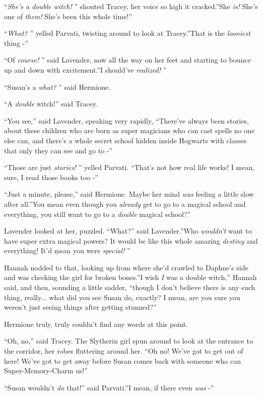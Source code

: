 ``\emph{She's a double witch!} '' shouted Tracey, her voice so high it
cracked.''She \emph{is!} She's one of \emph{them!} She's been this whole
time!''

``\emph{What?} '' yelled Parvati, twisting around to look at Tracey.''That
is the \emph{looniest} thing -''

``Of \emph{course!} '' said Lavender, now all the way on her feet and
starting to bounce up and down with excitement.''I should've
\emph{realized!} ''

``Susan's a \emph{what?} '' said Hermione.

``A \emph{double} witch!'' said Tracey.

``You see,'' said Lavender, speaking very rapidly, ``There've always
been stories, about these children who are born as super magicians who
can cast spells no one else can, and there's a whole secret school
hidden inside Hogwarts with classes that only they can see and go to -''

``Those are just \emph{stories!} '' yelled Parvati. ``That's not how real
life works! I mean, sure, I read those books too -''

``Just a minute, please,'' said Hermione. Maybe her mind \emph{was}
feeling a little slow after all.''You mean even though you
\emph{already} get to go to a magical school and everything, you still
want to go to a \emph{double} magical school?''

Lavender looked at her, puzzled. ``What?'' said Lavender.''Who
\emph{wouldn't} want to have super extra magical powers? It would be
like this whole amazing \emph{destiny} and everything! It'd mean you
were \emph{special!} ''

Hannah nodded to that, looking up from where she'd crawled to Daphne's
side and was checking the girl for broken bones.''I wish \emph{I} was a
double witch,'' Hannah said, and then, sounding a little sadder,
``though I don't believe there is any such thing, really... what
did you see Susan do, exactly? I mean, are you sure you weren't just
seeing things after getting stunned?''

Hermione truly, truly couldn't find any words at this point.

``Oh, no,'' said Tracey. The Slytherin girl spun around to look at the
entrance to the corridor, her robes fluttering around her. ``Oh no!
We've got to get out of here! We've got to get away before Susan comes
back with someone who can Super-Memory-Charm us!''

``Susan wouldn't \emph{do} that!'' said Parvati.''I mean, if there even
\emph{was} -''

